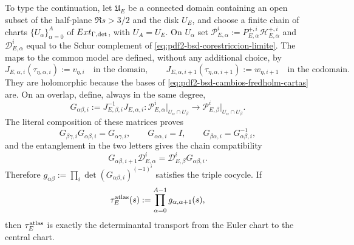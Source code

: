 To type the continuation, let $\mathfrak U_E$ be a connected domain containing
an open subset of the half-plane $\Re s>3/2$ and the disk $U_E$, and choose a finite
chain of charts $\{U_\alpha\}_{\alpha=0}^A$ of
$\operatorname{Ext}_{\Gamma,{\rm det}}$, with $U_A=U_E$. On $U_\alpha$ set
$\mathscr P_{E,\alpha}^i:=
P_{E,\alpha}^{+,i}\mathscr H_{E,\alpha}^{+,i}$ and
$\mathscr D_{E,\alpha}^i$ equal to the Schur complement of
\eqref{eq:pdf2-bsd-corestriccion-limite}. The maps to the common model are
defined, without any additional choice, by
\begin{equation}\label{eq:pdf2-bsd-j-cartas-modelo-comun}
 J_{E,\alpha,i}(\tau_{\eta,\alpha,i}):=v_{\eta,i}
 \quad\text{in the domain},
 \qquad
 J_{E,\alpha,i+1}(\tau_{\eta,\alpha,i+1}):=w_{\eta,i+1}
 \quad\text{in the codomain}.
\end{equation}
They are holomorphic because the bases of
\eqref{eq:pdf2-bsd-cambios-fredholm-cartas} are. On an overlap, define,
always in the same degree,
\begin{equation}\label{eq:pdf2-bsd-transiciones-atlas}
 G_{\alpha\beta,i}:=J_{E,\beta,i}^{-1}J_{E,\alpha,i}:
 \mathscr P_{E,\alpha}^i\big|_{U_\alpha\cap U_\beta}
 \longrightarrow
 \mathscr P_{E,\beta}^i\big|_{U_\alpha\cap U_\beta}.
\end{equation}
The literal composition of these matrices proves
\begin{equation}\label{eq:pdf2-bsd-cociclo-atlas}
 G_{\beta\gamma,i}G_{\alpha\beta,i}=G_{\alpha\gamma,i},
 \qquad G_{\alpha\alpha,i}=I,
 \qquad G_{\beta\alpha,i}=G_{\alpha\beta,i}^{-1},
\end{equation}
and the entanglement in the two letters gives the chain compatibility
\begin{equation}\label{eq:pdf2-bsd-cociclo-cadena}
 G_{\alpha\beta,i+1}\mathscr D_{E,\alpha}^i
 =\mathscr D_{E,\beta}^iG_{\alpha\beta,i}.
\end{equation}
Therefore
$g_{\alpha\beta}:=\prod_i\det(G_{\alpha\beta,i})^{(-1)^i}$ satisfies the
triple cocycle. If
\begin{equation}\label{eq:pdf2-bsd-tau-atlas}
 \tau_E^{\rm atlas}(s):=
 \prod_{\alpha=0}^{A-1}g_{\alpha,\alpha+1}(s),
\end{equation}
then $\tau_E^{\rm atlas}$ is exactly the determinantal transport
from the Euler chart to the central chart.

